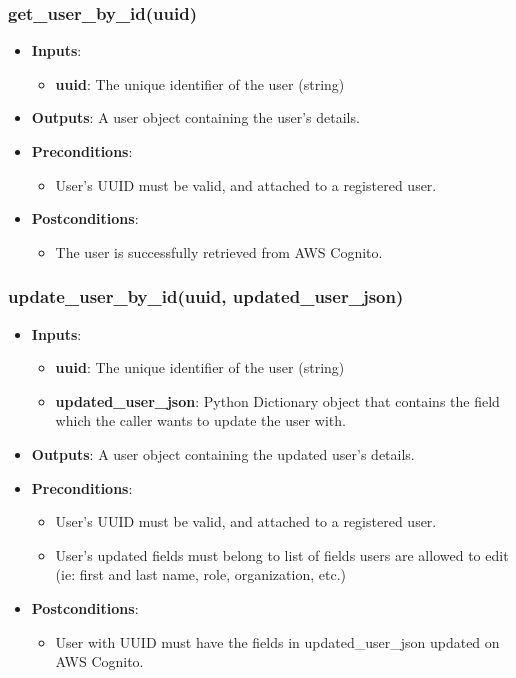 \documentclass[12pt, titlepage]{article}
\begin{document}
\subsubsection{get\_user\_by\_id(uuid)}
\begin{itemize}
    \item \textbf{Inputs}:
        \begin{itemize}
            \item \textbf{uuid}: The unique identifier of the user (string)
        \end{itemize}
    \item \textbf{Outputs}: A user object containing the user's details.
    \item \textbf{Preconditions}: 
        \begin{itemize}
            \item User's UUID must be valid, and attached to a registered user.
        \end{itemize}
    \item \textbf{Postconditions}: 
        \begin{itemize}
            \item The user is successfully retrieved from AWS Cognito.
        \end{itemize}
\end{itemize}

\subsubsection{update\_user\_by\_id(uuid, updated\_user\_json)}
\begin{itemize}
    \item \textbf{Inputs}:
        \begin{itemize}
            \item \textbf{uuid}: The unique identifier of the user (string)
            \item \textbf{updated\_user\_json}: Python Dictionary object that contains the field which the caller wants to update the user with.
        \end{itemize}
    \item \textbf{Outputs}: A user object containing the updated user's details.
    \item \textbf{Preconditions}: 
        \begin{itemize}
            \item User's UUID must be valid, and attached to a registered user.
            \item User's updated fields must belong to list of fields users are allowed to edit (ie: first and last name, role, organization, etc.)
        \end{itemize}
    \item \textbf{Postconditions}: 
        \begin{itemize}
            \item User with UUID must have the fields in updated\_user\_json updated on AWS Cognito.
        \end{itemize}
\end{itemize}
\end{document}
